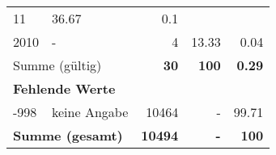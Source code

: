 \begin{longtable}{lXrrr}
       \num{11} &
       \num[round-mode=places,round-precision=2]{36.67} &
         \num[round-mode=places,round-precision=2]{0.1} \\

     2010 &
     \multicolumn{1}{X}{ -  } &


       \num{4} &
       \num[round-mode=places,round-precision=2]{13.33} &
         \num[round-mode=places,round-precision=2]{0.04} \\
     \midrule
     \multicolumn{2}{l}{Summe (gültig)} &
       \textbf{\num{30}} &
     \textbf{\num{100}} &
       \textbf{\num[round-mode=places,round-precision=2]{0.29}} \\
     \multicolumn{5}{l}{\textbf{Fehlende Werte}}\\
       -998 &
       keine Angabe &
         \num{10464} &
        - &
         \num[round-mode=places,round-precision=2]{99.71} \\
     \midrule
     \multicolumn{2}{l}{\textbf{Summe (gesamt)}} &
          \textbf{\num{10494}} &
        \textbf{-} &
        \textbf{\num{100}} \\
     \bottomrule
     \end{longtable}
     
